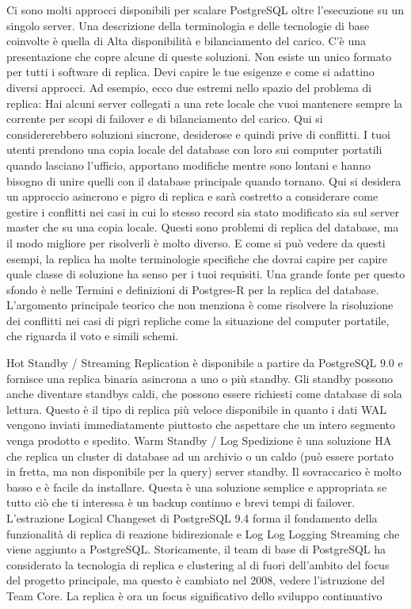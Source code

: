 Ci sono molti approcci disponibili per scalare PostgreSQL oltre l'esecuzione su un singolo server. Una descrizione della terminologia e delle tecnologie di base coinvolte è quella di Alta disponibilità e bilanciamento del carico. C'è una presentazione che copre alcune di queste soluzioni.
Non esiste un unico formato per tutti i software di replica. Devi capire le tue esigenze e come si adattino diversi approcci. Ad esempio, ecco due estremi nello spazio del problema di replica:
Hai alcuni server collegati a una rete locale che vuoi mantenere sempre la corrente per scopi di failover e di bilanciamento del carico. Qui si considererebbero soluzioni sincrone, desiderose e quindi prive di conflitti.
I tuoi utenti prendono una copia locale del database con loro sui computer portatili quando lasciano l'ufficio, apportano modifiche mentre sono lontani e hanno bisogno di unire quelli con il database principale quando tornano. Qui si desidera un approccio asincrono e pigro di replica e sarà costretto a considerare come gestire i conflitti nei casi in cui lo stesso record sia stato modificato sia sul server master che su una copia locale.
Questi sono problemi di replica del database, ma il modo migliore per risolverli è molto diverso. E come si può vedere da questi esempi, la replica ha molte terminologie specifiche che dovrai capire per capire quale classe di soluzione ha senso per i tuoi requisiti. Una grande fonte per questo sfondo è nelle Termini e definizioni di Postgres-R per la replica del database. L'argomento principale teorico che non menziona è come risolvere la risoluzione dei conflitti nei casi di pigri repliche come la situazione del computer portatile, che riguarda il voto e simili schemi.

Hot Standby / Streaming Replication è disponibile a partire da PostgreSQL 9.0 e fornisce una replica binaria asincrona a uno o più standby. Gli standby possono anche diventare standbys caldi, che possono essere richiesti come database di sola lettura. Questo è il tipo di replica più veloce disponibile in quanto i dati WAL vengono inviati immediatamente piuttosto che aspettare che un intero segmento venga prodotto e spedito.
Warm Standby / Log Spedizione è una soluzione HA che replica un cluster di database ad un archivio o un caldo (può essere portato in fretta, ma non disponibile per la query) server standby. Il sovraccarico è molto basso e è facile da installare. Questa è una soluzione semplice e appropriata se tutto ciò che ti interessa è un backup continuo e brevi tempi di failover.
L'estrazione Logical Changeset di PostgreSQL 9.4 forma il fondamento della funzionalità di replica di reazione bidirezionale e Log Log Logging Streaming che viene aggiunto a PostgreSQL.
Storicamente, il team di base di PostgreSQL ha considerato la tecnologia di replica e clustering al di fuori dell'ambito del focus del progetto principale, ma questo è cambiato nel 2008, vedere l'istruzione del Team Core. La replica è ora un focus significativo dello sviluppo continuativo

